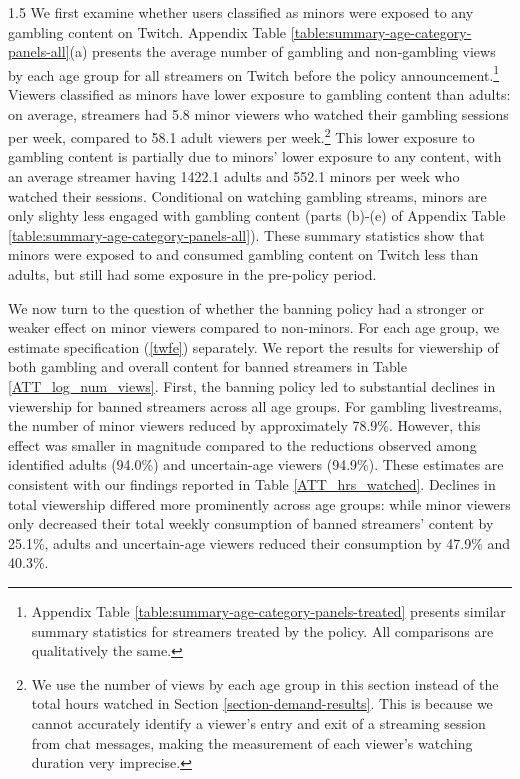 \documentclass[a4paper,12pt]{article}
\begin{document}
\begin{spacing}{1.5}
We first examine whether users classified as minors were exposed to any gambling content on Twitch. Appendix Table \ref{table:summary-age-category-panels-all}(a) presents the average number of gambling and non-gambling views by each age group for all streamers on Twitch before the policy announcement.\footnote{Appendix Table \ref{table:summary-age-category-panels-treated} presents similar summary statistics for streamers treated by the policy. All comparisons are qualitatively the same.} Viewers classified as minors have lower exposure to gambling content than adults: on average, streamers had 5.8 minor viewers who watched their gambling sessions per week, compared to 58.1 adult viewers per week.\footnote{We use the number of views by each age group in this section instead of the total hours watched in Section \ref{section-demand-results}. This is because we cannot accurately identify a viewer's entry and exit of a streaming session from chat messages, making the measurement of each viewer's watching duration very imprecise.} This lower exposure to gambling content is partially due to minors' lower exposure to any content, with an average streamer having 1422.1 adults and 552.1 minors per week who watched their sessions. Conditional on watching gambling streams, minors are only slighty less engaged with gambling content (parts (b)-(e) of Appendix Table \ref{table:summary-age-category-panels-all}). These summary statistics show that minors were exposed to and consumed gambling content on Twitch less than adults, but still had some exposure in the pre-policy period.


We now turn to the question of whether the banning policy had a stronger or weaker effect on minor viewers compared to non-minors. For each age group, we estimate specification (\ref{twfe}) separately. We report the results for viewership of both gambling and overall content for banned streamers in Table \ref{ATT_log_num_views}. First, the banning policy led to substantial declines in viewership for banned streamers across all age groups. For gambling livestreams, the number of minor viewers reduced by approximately 78.9\%. However, this effect was smaller in magnitude compared to the reductions observed among identified adults (94.0\%) and uncertain-age viewers (94.9\%). These estimates are consistent with our findings reported in Table \ref{ATT_hrs_watched}. Declines in total viewership differed more prominently across age groups: while minor viewers only decreased their total weekly consumption of banned streamers' content by 25.1\%, adults and uncertain-age viewers reduced their consumption by 47.9\% and 40.3\%.


\end{spacing}
\end{document}
